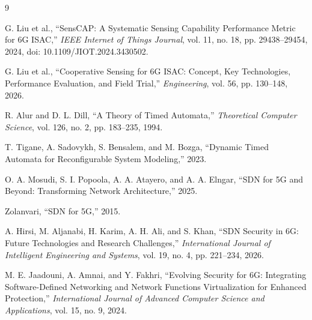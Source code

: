 \documentclass[10pt,a4paper]{article}
\begin{document}
\begin{thebibliography}{9}

G. Liu et al., ``SensCAP: A Systematic Sensing Capability Performance Metric for 6G ISAC,'' \emph{IEEE Internet of Things Journal}, vol. 11, no. 18, pp. 29438--29454, 2024, doi: 10.1109/JIOT.2024.3430502.

G. Liu et al., ``Cooperative Sensing for 6G ISAC: Concept, Key Technologies, Performance Evaluation, and Field Trial,'' \emph{Engineering}, vol. 56, pp. 130--148, 2026.

R. Alur and D. L. Dill, ``A Theory of Timed Automata,'' \emph{Theoretical Computer Science}, vol. 126, no. 2, pp. 183--235, 1994.

T. Tigane, A. Sadovykh, S. Bensalem, and M. Bozga, ``Dynamic Timed Automata for Reconfigurable System Modeling,'' 2023.

O. A. Mosudi, S. I. Popoola, A. A. Atayero, and A. A. Elngar, ``SDN for 5G and Beyond: Transforming Network Architecture,'' 2025.

Zolanvari, ``SDN for 5G,'' 2015.

A. Hirsi, M. Aljanabi, H. Karim, A. H. Ali, and S. Khan, ``SDN Security in 6G: Future Technologies and Research Challenges,'' \emph{International Journal of Intelligent Engineering and Systems}, vol. 19, no. 4, pp. 221--234, 2026.

M. E. Jaadouni, A. Amnai, and Y. Fakhri, ``Evolving Security for 6G: Integrating Software-Defined Networking and Network Functions Virtualization for Enhanced Protection,'' \emph{International Journal of Advanced Computer Science and Applications}, vol. 15, no. 9, 2024.

\end{thebibliography}
\end{document}
